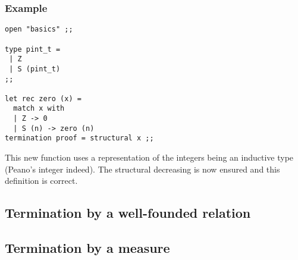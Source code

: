 \subsubsection{Example}

{\scriptsize
\begin{lstlisting}
open "basics" ;;

type pint_t =
 | Z
 | S (pint_t)
;;

let rec zero (x) =
  match x with
  | Z -> 0
  | S (n) -> zero (n)
termination proof = structural x ;;
\end{lstlisting}
}

This new function uses a representation of the integers being an inductive
type (Peano's integer indeed). The structural decreasing is now ensured and
this definition is correct.


\subsection{Termination by a well-founded relation}
\subsection{Termination by a measure}
